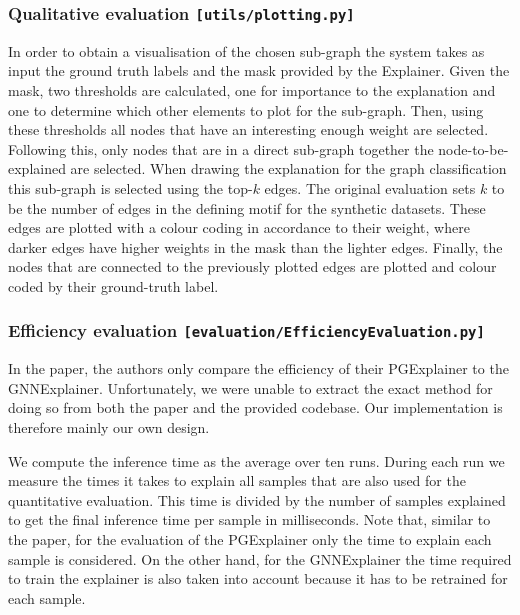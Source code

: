 \subsubsection{Qualitative evaluation \hfill \texttt{[utils/plotting.py]}}
In order to obtain a visualisation of the chosen sub-graph the system takes as input the ground truth labels and the mask provided by the Explainer. Given the mask, two thresholds are calculated, one for importance to the explanation and one to determine which other elements to plot for the sub-graph. Then, using these thresholds all nodes that have an interesting enough weight are selected. Following this, only nodes that are in a direct sub-graph together the node-to-be-explained are selected. When drawing the explanation for the graph classification this sub-graph is selected using the top-$k$ edges. The original evaluation sets $k$ to be the number of edges in the defining motif for the synthetic datasets. These edges are plotted with a colour coding in accordance to their weight, where darker edges have higher weights in the mask than the lighter edges. Finally, the nodes that are connected to the previously plotted edges are plotted and colour coded by their ground-truth label.

\subsubsection{Efficiency evaluation \hfill \texttt{[evaluation/EfficiencyEvaluation.py]}}
In the paper, the authors only compare the efficiency of their PGExplainer to the GNNExplainer. Unfortunately, we were unable to extract the exact method for doing so from both the paper and the provided codebase. Our implementation is therefore mainly our own design.

We compute the inference time as the average over ten runs. During each run we measure the times it takes to explain all samples that are also used for the quantitative evaluation. This time is divided by the number of samples explained to get the final inference time per sample in milliseconds. Note that, similar to the paper, for the evaluation of the PGExplainer only the time to explain each sample is considered. On the other hand, for the GNNExplainer the time required to train the explainer is also taken into account because it has to be retrained for each sample. 


